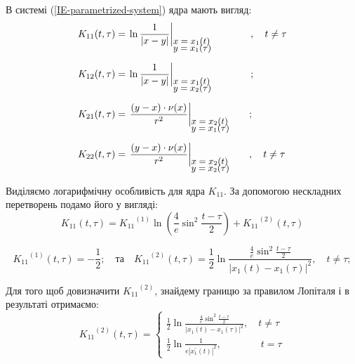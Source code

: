 \documentclass{beamer}
\numberwithin{equation}{section}
\begin{document}
	\begin{frame}
		В системі (\ref{IE-parametrized-system}) ядра мають вигляд:
		$$
		\begin{array}{l}
			\displaystyle
			K_{11}(t, \tau) = \left.
			\ln{\frac{1}{\abs{x - y}}}
			\right|_{
				{\small \parbox{20mm}{$ x = x_1(t)$ \\[-4pt] $y = x_1 ({\tau})$}}
			} \quad \quad, \quad t \neq \tau
			\\ [0.8cm]
			
			\displaystyle
			K_{12}(t, \tau) = \left.
			\ln{\frac{1}{\abs{x - y}}}
			\right|_{
				{\small \parbox{20mm}{$ x = x_1(t)$ \\[-4pt] $y = x_2 ({\tau})$}}
			} \quad \quad;
			\\ [0.8cm]
			
			\displaystyle
			K_{21}(t, \tau) = \left.
			\frac{(y - x) \cdot \nu(x)}{r^2}
			\right|_{
				{\small \parbox{20mm}{$ x = x_2(t)$ \\[-4pt] $y = x_1 ({\tau})$}}
			};
			\\ [0.8cm]
			
			\displaystyle
			K_{22}(t, \tau) = \left.
			\frac{(y - x) \cdot \nu(x)}{r^2}
			\right|_{
				{\small \parbox{20mm}{$ x = x_2(t)$ \\[-4pt] $y = x_2 ({\tau})$}}
			} 
			, \quad t \neq \tau
		\end{array}
		$$		
	\end{frame}
	

	\begin{frame}
		Виділяємо логарифмічну особливість для ядра $K_{11}$. За допомогою нескладних перетворень подамо його у вигляді:
		$$
		\displaystyle
		K_{11}(t, \tau) = {K_{11}}^{(1)} \ln \left(\frac{4}{e} \sin ^{2}  \frac{t-\tau}{2}\right)+{K_{11}}^{(2)}(t, \tau)
		$$
		
		$$
		\displaystyle
		{K_{11}}^{(1)}(t, \tau) =-\frac{1}{2};
		\displaystyle
		\quad \text{та} \quad
		\displaystyle
		{K_{11}}^{(2)}(t, \tau) =\frac{1}{2} \ln{\frac{\frac{4}{e} \sin ^{2} \frac{t-\tau}{2}}{\left|x_{1}(t)-x_{1}(\tau)\right|^{2}}}, \quad t \neq \tau;
		$$
		
		Для того щоб довизначити ${K_{11}}^{(2)}$, знайдему границю за правилом Лопіталя і в результаті отримаємо:
		$$
		{K_{11}}^{(2)}(t, \tau) =
		\left\{
		\begin{array}{l}
			\displaystyle
			\frac{1}{2} \ln{\frac{\frac{4}{e} \sin ^{2} \frac{t-\tau}{2}}{\left|x_{1}(t)-x_{1}(\tau)\right|^{2}}}
			,\quad t \neq \tau
			\\ [1cm]
			
			\displaystyle
			\frac{1}{2} \ln \frac{1}{e\left|x_{1}^{\prime}(t)\right|^{2}}
			,\quad  \quad  \quad  \quad   t = \tau
		\end{array}
		\right.
		$$
		
	\end{frame}
\end{document}
